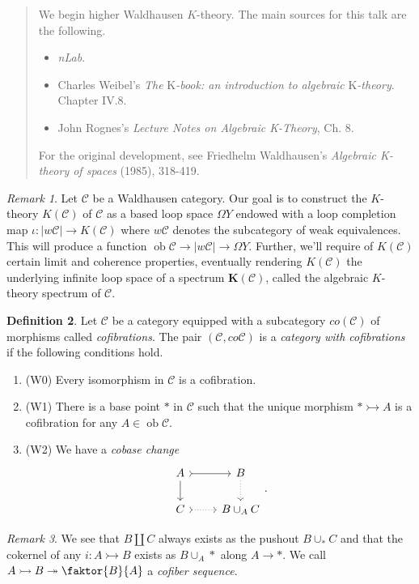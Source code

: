 \documentclass[10pt,letterpaper,cm]{nupset}
\theoremstyle{definition}
\newtheorem{definition}{Definition}
\theoremstyle{theorem}
\theoremstyle{remark}
\newtheorem{remark}[definition]{Remark}
\newcommand{\1}{\mathbf{1}}
\renewcommand{\c}{\mathscr{C}}
\newcommand{\0}{\vec 0}
\DeclareMathOperator{\ob}{ob}
\begin{document}
\begin{abstract}
We begin higher Waldhausen $K$-theory. The main sources for this talk are the following.
\begin{itemize}
\item \textit{nLab}.
\item Charles Weibel's \textit{The} K\textit{-book: an introduction to algebraic} K\textit{-theory}.  Chapter IV.8.
\item John Rognes's \textit{Lecture Notes on Algebraic K-Theory}, Ch. 8.
\end{itemize}
For the original development, see Friedhelm Waldhausen's \textit{Algebraic K-theory of spaces} (1985), 318-419. 
\end{abstract}

\begin{remark}
Let $\c$ be a Waldhausen category. Our goal is to construct the $K$-theory $K(\c)$ of $\c$ as a based loop space $\Omega Y$ endowed with a loop completion map $ \iota : |w \c| \to K(\c)$ where $w \c$ denotes the subcategory of weak equivalences. This will produce a function $\ob \c \to |w \c| \to \Omega Y$. Further, we'll require of $K(\c)$ certain limit and coherence properties, eventually rendering $K(\c)$ the underlying infinite loop space of a spectrum $\mathbf{K}(\c)$, called the algebraic $K$-theory spectrum of $\c$.
\end{remark}

\begin{definition}
Let $\c$ be a category equipped with a subcategory $co(\c)$ of morphisms called \textit{cofibrations}. The pair $(\c, co\c)$ is a \textit{category with cofibrations} if the following conditions hold.
\begin{enumerate}
\item (W0) Every isomorphism in $\c$ is a cofibration.
\item (W1) There is a base point $\ast$ in $\c$ such that the unique morphism $\ast \rightarrowtail A$ is a cofibration for any $A \in \ob \c$.
\item (W2) We have a \textit{cobase change}
\[
\begin{tikzcd}
A \arrow[d] \arrow[r, tail] & B \arrow[d, dotted] \\
C \arrow[r, dotted, tail] & B \cup_A C
\end{tikzcd}.
\]
\end{enumerate}
\end{definition}

\begin{remark}
We see that $B \coprod C$ always exists as the pushout $B \cup_{\ast} C$ and that the cokernel of any $i : A \rightarrowtail B$ exists as $B \cup_A \ast$ along $A \to \ast$. We call $A \rightarrowtail  B \twoheadrightarrow \faktor{B}{A}$ a \textit{cofiber sequence}.
\end{remark}
\end{document}
